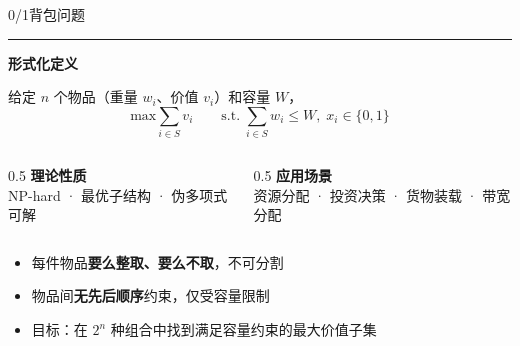 \documentclass[9pt]{ctexbeamer}
\newenvironment{leftblock}[1]{%
  \vspace{0.3cm}
  \begin{beamercolorbox}[wd=\textwidth,leftskip=0.4cm,rightskip=0.4cm]{}
    \textcolor{ember}{\rule{2.5pt}{0.55cm}}\hspace{0.2cm}
    {\bfseries\color{ink}#1}
    \par\vspace{0.1cm}
    \hspace{0.35cm}\begin{minipage}{\dimexpr\textwidth-1.2cm\relax}
}{%
    \end{minipage}
  \end{beamercolorbox}
  \vspace{0.15cm}
}
\newcommand{\hi}[1]{\textcolor{ember}{\textbf{#1}}}
\begin{document}
\begin{frame}{0/1背包问题}

\begin{leftblock}{形式化定义}
给定 $n$ 个物品（重量 $w_i$、价值 $v_i$）和容量 $W$，
\[\text{max}\sum_{i\in S} v_i \qquad \text{s.t.}\;\sum_{i\in S} w_i \leq W,\; x_i \in \{0,1\}\]
\end{leftblock}

\vspace{0.2cm}

\begin{columns}[T]
\begin{column}{0.5\textwidth}
{\small\color{ink}\textbf{理论性质}}\\[0.1cm]
{\footnotesize\color{slate}NP-hard · 最优子结构 · 伪多项式可解}
\end{column}
\begin{column}{0.5\textwidth}
{\small\color{ink}\textbf{应用场景}}\\[0.1cm]
{\footnotesize\color{slate}资源分配 · 投资决策 · 货物装载 · 带宽分配}
\end{column}
\end{columns}

\vspace{0.3cm}
\begin{itemize}
  \item 每件物品\hi{要么整取、要么不取}，不可分割
  \item 物品间\hi{无先后顺序}约束，仅受容量限制
  \item 目标：在 $2^n$ 种组合中找到满足容量约束的最大价值子集
\end{itemize}

\end{frame}
\end{document}
